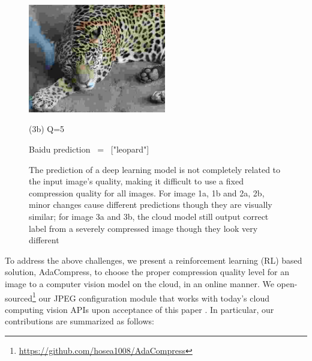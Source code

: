 \begin{figure}[htbp]
\begin{minipage}{0.5\linewidth}
		\centerline{\includegraphics[width=6.0cm, trim=0 0 0 0, clip]{figures/tiger_lowq.jpeg}}
		\centerline{(3b) Q=5}
		\centerline{Baidu prediction \ = \ ["leopard"]}
		\vspace{0.3cm}
	\end{minipage}
	\caption{The prediction of a deep learning model is not completely related to the input image's quality, making it difficult to use a fixed compression quality for all images. For image 1a, 1b and 2a, 2b, minor changes cause different predictions though they are visually similar; for image 3a and 3b, the cloud model still output correct label from a severely compressed image though they look very different}
	\label{fig: compress_accuracy}
\end{figure}

To address the above challenges, we present a reinforcement learning (RL) based solution, AdaCompress, to choose the proper compression quality level for an image to a computer vision model on the cloud, in an online manner. We open-sourced\footnote{\url{https://github.com/hosea1008/AdaCompress}} our JPEG configuration module that works with today's cloud computing vision APIs upon acceptance of this paper \cite{2019adacompress}. In particular, our contributions are summarized as follows: %

